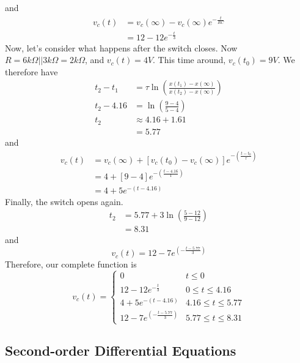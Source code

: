 \documentclass[nobib]{tufte-handout}
\begin{document}
and
\begin{align}
    v_c(t) &= v_c(\infty) - v_c(\infty)e^{-\frac{t}{RC}} \\
    &= 12 - 12e^{-\frac{t}{3}}
\end{align}
Now, let's consider what happens after the switch closes. 
Now $R = 6k\Omega || 3k\Omega = 2k\Omega$, and $v_c(t) = 4V$. 
This time around, $v_c(t_0) = 9V$. We therefore have 
\begin{align}
    t_2 - t_1 &= \tau \ln{\left(\frac{x(t_1) - x(\infty)}{x(t_2) - x(\infty)}\right)} \\
    t_2 - 4.16 &= \ln{\left(\frac{9-4}{5-4}\right)} \\
    t_2 &\approx 4.16 + 1.61 \\
    &= 5.77
\end{align}
and
\begin{align}
    v_c(t) &= v_c(\infty) + \left[v_c(t_0) - v_c(\infty)\right]e^{-\left(\frac{t-t_0}{\tau}\right)} \\
    &= 4 + \left[9 - 4\right]e^{-\left(\frac{t - 4.16}{1}\right)} \\
    &= 4 + 5e^{-(t - 4.16)}
\end{align}
Finally, the switch opens again. 
\begin{align}
    t_2 &= 5.77 + 3\ln{\left(\frac{5-12}{9-12}\right)} \\
    &= 8.31
\end{align}
and
\begin{equation}
    v_c(t) = 12 - 7e^{\left(-\frac{t-5.77}{3}\right)}
\end{equation}
Therefore, our complete function is 
\[v_c(t) = \begin{cases} 
      0 & t \leq 0 \\
      12 - 12e^{-\frac{t}{3}} & 0 \leq t \leq 4.16 \\
      4 + 5e^{-(t - 4.16)} & 4.16 \leq t \leq 5.77 \\
      12 - 7e^{\left(-\frac{t-5.77}{3}\right)} &  5.77 \leq t \leq 8.31
   \end{cases}
\]

\subsection{Second-order Differential Equations}
\end{document}

